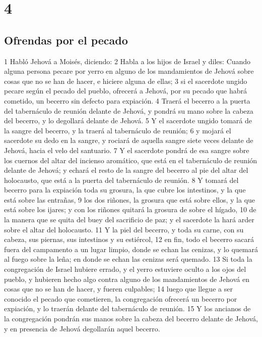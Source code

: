 \chapter{4}

\section{Ofrendas por el pecado}

1 Habló Jehová a Moisés, diciendo:
2 Habla a los hijos de Israel y diles: Cuando alguna persona pecare por yerro en alguno de los mandamientos de Jehová sobre cosas que no se han de hacer, e hiciere alguna de ellas;
3 si el sacerdote ungido pecare según el pecado del pueblo, ofrecerá a Jehová, por su pecado que habrá cometido, un becerro sin defecto para expiación.
4 Traerá el becerro a la puerta del tabernáculo de reunión delante de Jehová, y pondrá su mano sobre la cabeza del becerro, y lo degollará delante de Jehová.
5 Y el sacerdote ungido tomará de la sangre del becerro, y la traerá al tabernáculo de reunión;
6 y mojará el sacerdote su dedo en la sangre, y rociará de aquella sangre siete veces delante de Jehová, hacia el velo del santuario.
7 Y el sacerdote pondrá de esa sangre sobre los cuernos del altar del incienso aromático, que está en el tabernáculo de reunión delante de Jehová; y echará el resto de la sangre del becerro al pie del altar del holocausto, que está a la puerta del tabernáculo de reunión.
8 Y tomará del becerro para la expiación toda su grosura, la que cubre los intestinos, y la que está sobre las entrañas,
9 los dos riñones, la grosura que está sobre ellos, y la que está sobre los ijares; y con los riñones quitará la grosura de sobre el hígado,
10 de la manera que se quita del buey del sacrificio de paz; y el sacerdote la hará arder sobre el altar del holocausto.
11 Y la piel del becerro, y toda su carne, con su cabeza, sus piernas, sus intestinos y su estiércol,
12 en fin, todo el becerro sacará fuera del campamento a un lugar limpio, donde se echan las cenizas, y lo quemará al fuego sobre la leña; en donde se echan las cenizas será quemado.
13 Si toda la congregación de Israel hubiere errado, y el yerro estuviere oculto a los ojos del pueblo, y hubieren hecho algo contra alguno de los mandamientos de Jehová en cosas que no se han de hacer, y fueren culpables;
14 luego que llegue a ser conocido el pecado que cometieren, la congregación ofrecerá un becerro por expiación, y lo traerán delante del tabernáculo de reunión.
15 Y los ancianos de la congregación pondrán sus manos sobre la cabeza del becerro delante de Jehová, y en presencia de Jehová degollarán aquel becerro.
